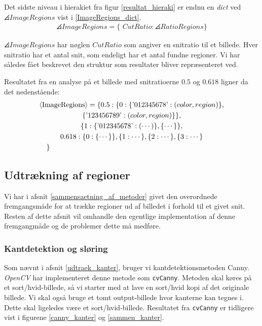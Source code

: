 {Det sidste niveau i hierakiet fra figur \ref{resultat_hieraki} er endnu
en \emph{dict} ved $\angles{ImageRegions}$ vist i
\eqref{ImageRegions_dict}.
\begin{eqnarray}
    \angles{ImageRegions} = \{ \textit{~CutRatio} : \angles{RatioRegions} \}
    \label{ImageRegions_dict}
\end{eqnarray}

\noindent $\angles{ImageRegions}$ har nøglen $CutRatio$ som angiver en
snitratio til et billede. Hver snitratio har et antal snit, som endeligt
har et antal fundne regioner. Vi har således fået beskrevet den struktur
som resultater bliver repræsenteret ved.

Resultatet fra en analyse på et billede med snitratioerne $0.5$ og
$0.618$ ligner da det nedenstående:
\begin{multline}
    \angles{ImageRegions} = \{ 0.5 : \{ 0 : \{ \textrm{'012345678'} : (color, region) \},\\
                                            \{ \textrm{'123456789'} : (color, region) \}
                                            \},\\
                                            \{ 1 : \{ \textrm{'012345678'} : ( \cdots ) \}, 
                                            \{ \cdots \} \}, \\
                              0.618 : \{ 0 : \{ \cdots \} \}, \{ 1 :
                              \cdots \}, \{ 2 : \cdots \}, \{ 3 : \cdots
                              \} \\
    \shoveleft{\}}\shoveright{}
    \label{CutRegions_dict}
\end{multline}

\subsection{Udtrækning af regioner}
Vi har i afsnit \ref{sammensaetning_af_metoder} givet den overordnede
fremgangsmåde for at trække regioner ud af billedet i forhold til et
givet snit. Resten af dette afsnit vil omhandle den egentlige
implementation af denne fremgangmåde og de problemer dette må medføre.

\subsubsection{Kantdetektion og sløring}
Som nævnt i afsnit \ref{udtraek_kanter}, bruger vi kantdetektionsmetoden
Canny. \emph{OpenCV} har implementeret denne metode som
\texttt{cvCanny}. Metoden skal køres på et sort/hvid-billede, så vi
starter med at lave en sort/hvid kopi af det originale billede. Vi skal
også bruge et tomt output-billede hvor kanterne kan tegnes i. Dette skal
ligeledes være et sort/hvid-billede. Resultatet fra \texttt{cvCanny} er
tidligere vist i figurene \ref{canny_kanter} og \ref{sammen_kanter}.

}
